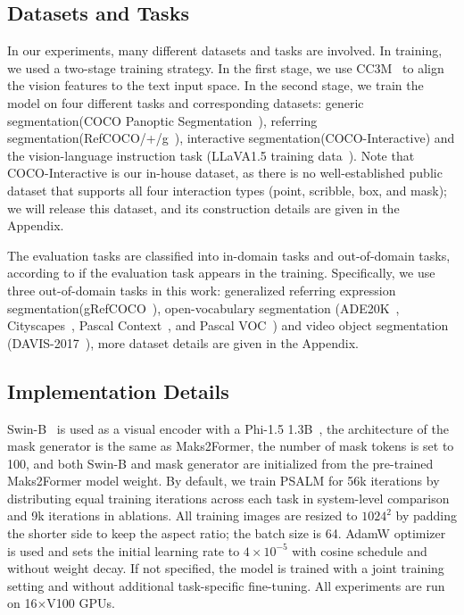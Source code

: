 \subsection{Datasets and Tasks}
In our experiments, many different datasets and tasks are involved. In training, we used a two-stage training strategy. In the first stage, we use CC3M~\cite{cc3m} to align the vision features to the text input space. In the second stage, we train the model on four different tasks and corresponding datasets: generic segmentation(COCO Panoptic Segmentation~\cite{coco}), referring segmentation(RefCOCO/+/g~\cite{refcoco,refcocog}), interactive segmentation(COCO-Interactive) and the vision-language instruction task (LLaVA1.5 training data~\cite{llavav1_5}). Note that COCO-Interactive is our in-house dataset, as there is no well-established public dataset that supports all four interaction types (point, scribble, box, and mask); we will release this dataset, and its construction details are given in the Appendix.

The evaluation tasks are classified into in-domain tasks and out-of-domain tasks, according to if the evaluation task appears in the training. Specifically, we use three out-of-domain tasks in this work: generalized referring expression segmentation(gRefCOCO~\cite{grefcoco}), open-vocabulary segmentation (ADE20K~\cite{ade20k}, Cityscapes~\cite{cordts2016cityscapes}, Pascal Context~\cite{pc}, and Pascal VOC~\cite{pascal-voc-2010}) and video object segmentation (DAVIS-2017~\cite{davis}), more dataset details are given in the Appendix.

\subsection{Implementation Details}
Swin-B~\cite{Swin} is used as a visual encoder with a Phi-1.5 1.3B~\cite{phi15}, the architecture of the mask generator is the same as Maks2Former, the number of mask tokens is set to 100, and both Swin-B and mask generator are initialized from the pre-trained Maks2Former model weight. By default, we train PSALM for 56k iterations by distributing equal training iterations across each task in system-level comparison and 9k iterations in ablations. All training images are resized to $1024^2$ by padding the shorter side to keep the aspect ratio; the batch size is 64. AdamW optimizer is used and sets the initial learning rate to $4\times10^{-5}$ with cosine schedule and without weight decay. If not specified, the model is trained with a joint training setting and without additional task-specific fine-tuning. All experiments are run on 16$\times$V100 GPUs.

